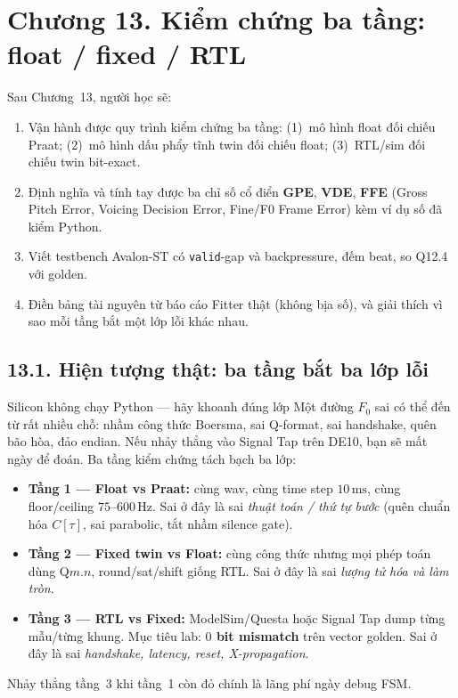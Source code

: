\clearpage
{}
\section*{Chương 13. Kiểm chứng ba tầng: float / fixed / RTL}

\begin{learningobj}
Sau Chương~13, người học sẽ:
\begin{enumerate}[leftmargin=1.4em]
    \item Vận hành được quy trình kiểm chứng ba tầng: (1)~mô hình float đối chiếu Praat; (2)~mô hình dấu phẩy tĩnh twin đối chiếu float; (3)~RTL/sim đối chiếu twin bit-exact.
    \item Định nghĩa và tính tay được ba chỉ số cổ điển \textbf{GPE}, \textbf{VDE}, \textbf{FFE} (Gross Pitch Error, Voicing Decision Error, Fine/F0 Frame Error) kèm ví dụ số đã kiểm Python.
    \item Viết testbench Avalon-ST có \texttt{valid}-gap và backpressure, đếm beat, so Q12.4 với golden.
    \item Điền bảng tài nguyên từ báo cáo Fitter thật (không bịa số), và giải thích vì sao mỗi tầng bắt một lớp lỗi khác nhau.
\end{enumerate}
\end{learningobj}

\subsection*{13.1. Hiện tượng thật: ba tầng bắt ba lớp lỗi}

\begin{firstprin}{Silicon không chạy Python --- hãy khoanh đúng lớp}
Một đường $F_0$ sai có thể đến từ rất nhiều chỗ: nhầm công thức Boersma, sai Q-format, sai handshake, quên bão hòa, đảo endian. Nếu nhảy thẳng vào Signal Tap trên DE10, bạn sẽ mất ngày để đoán. Ba tầng kiểm chứng tách bạch ba lớp:
\begin{itemize}[leftmargin=1.4em]
    \item \textbf{Tầng 1 --- Float vs Praat:} cùng wav, cùng time step $10\,\text{ms}$, cùng floor/ceiling $75$--$600\,\text{Hz}$. Sai ở đây là sai \emph{thuật toán / thứ tự bước} (quên chuẩn hóa $C[\tau]$, sai parabolic, tắt nhầm silence gate).
    \item \textbf{Tầng 2 --- Fixed twin vs Float:} cùng công thức nhưng mọi phép toán dùng Q$m.n$, round/sat/shift giống RTL. Sai ở đây là sai \emph{lượng tử hóa và làm tròn}.
    \item \textbf{Tầng 3 --- RTL vs Fixed:} ModelSim/Questa hoặc Signal Tap dump từng mẫu/từng khung. Mục tiêu lab: \textbf{$0$ bit mismatch} trên vector golden. Sai ở đây là sai \emph{handshake, latency, reset, X-propagation}.
\end{itemize}
Nhảy thẳng tầng~3 khi tầng~1 còn đỏ chính là lãng phí ngày debug FSM.
\end{firstprin}

